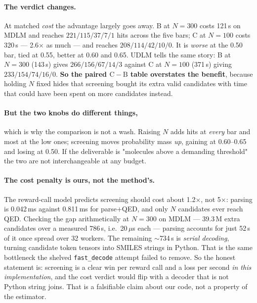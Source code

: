 \documentclass[11pt]{article}
\begin{document}
\paragraph{The verdict changes.} At matched \emph{cost} the advantage largely
goes away. B at $N=300$ costs 121\,s on MDLM and reaches
$221 / 115 / 37 / 7 / 1$ hits across the five bars; C at $N=100$ costs
320\,s --- 2.6$\times$ as much --- and reaches $208 / 114 / 42 / 10 / 0$. It is
\emph{worse} at the 0.50 bar, tied at 0.55, better at 0.60 and 0.65. UDLM tells
the same story: B at $N=300$ (143\,s) gives $266 / 156 / 67 / 14 / 3$ against C
at $N=100$ (371\,s) giving $233 / 154 / 74 / 16 / 0$. \textbf{So the paired
$\mathrm{C}-\mathrm{B}$ table overstates the benefit}, because holding $N$ fixed
hides that screening bought its extra valid candidates with time that could have
been spent on more candidates instead.

\paragraph{But the two knobs do different things,} which is why the comparison is
not a wash. Raising $N$ adds hits at \emph{every} bar and most at the low ones;
screening moves probability mass \emph{up}, gaining at 0.60--0.65 and losing at
0.50. If the deliverable is "molecules above a demanding threshold" the two are
not interchangeable at any budget.

\paragraph{The cost penalty is ours, not the method's.} The reward-call model
predicts screening should cost about 1.2$\times$, not 5$\times$: parsing is
0.042\,ms against 0.811\,ms for parse${+}$QED, and only $N$ candidates ever
reach QED. Checking the gap arithmetically at $N=300$ on MDLM --- 39.3\,M extra
candidates over a measured 786\,s, i.e.\ 20\,$\mu$s each --- parsing accounts
for just 52\,s of it once spread over 32 workers. The remaining $\sim$734\,s is
\emph{serial decoding}, turning candidate token tensors into SMILES strings in
Python. That is the same bottleneck the shelved \texttt{fast\_decode} attempt
failed to remove. So the honest statement is: screening is a clear win per
reward call and a loss per second \emph{in this implementation}, and the cost
verdict would flip with a decoder that is not Python string joins. That is a
falsifiable claim about our code, not a property of the estimator.
\end{document}
